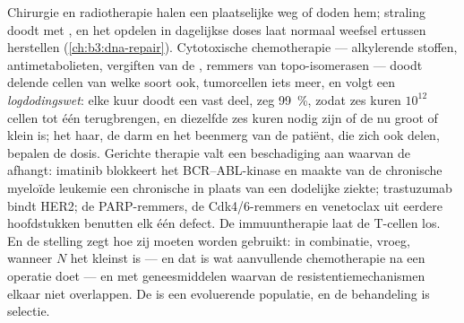 \begin{example}\label{ex:b3:cancer-biology:therapy}
Chirurgie en radiotherapie halen een plaatselijke  weg of doden
hem; straling doodt met , en het opdelen in
dagelijkse doses laat normaal weefsel ertussen herstellen
(\cref{ch:b3:dna-repair}). Cytotoxische chemotherapie --- alkylerende
stoffen, antimetabolieten, vergiften van de , remmers van
topo-isomerasen --- doodt delende cellen van welke soort ook,
tumorcellen iets meer, en volgt een \emph{logdodingswet}: elke kuur
doodt een vast deel, zeg \qty{99}{\%}, zodat zes kuren $10^{12}$ cellen
tot één terugbrengen, en diezelfde zes kuren nodig zijn of de  nu
groot of klein is; het haar, de darm en het beenmerg van de patiënt,
die zich ook delen, bepalen de dosis. Gerichte therapie valt een
beschadiging aan waarvan de  afhangt: imatinib blokkeert het
BCR--ABL-kinase en maakte van de chronische myeloïde leukemie een
chronische in plaats van een dodelijke ziekte; trastuzumab bindt HER2;
de PARP-remmers, de Cdk4/6-remmers en venetoclax uit eerdere
hoofdstukken benutten elk één defect. De immuuntherapie laat de
T-cellen los. En de stelling zegt hoe zij moeten worden gebruikt: in
combinatie, vroeg, wanneer $N$ het kleinst is --- en dat is wat
aanvullende chemotherapie na een operatie doet --- en met
geneesmiddelen waarvan de resistentiemechanismen elkaar niet
overlappen. De  is een evoluerende populatie, en de behandeling is
selectie.
\end{example}

